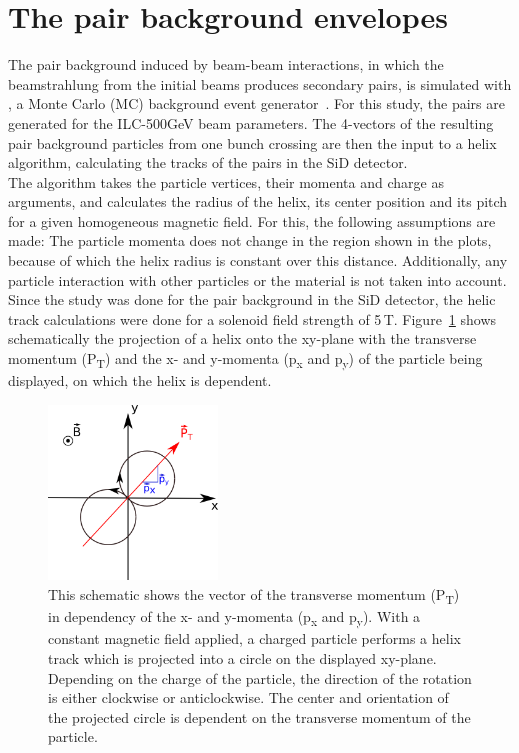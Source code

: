 \section{The pair background envelopes}
\label{Detector}
The pair background induced by beam-beam interactions, in which the beamstrahlung from the initial beams produces secondary \Pep \Pem pairs, is simulated with \guineapig, a Monte Carlo (MC) background event generator~\cite{Schulte:1997nga}.
For this study, the pairs are generated for the ILC-500GeV beam parameters.
The 4-vectors of the resulting pair background particles from one bunch crossing are then the input to a helix algorithm, calculating the tracks of the pairs in the SiD detector.\\
The algorithm takes the particle vertices, their momenta and charge as arguments, and calculates the radius of the helix, its center position and its pitch for a given homogeneous magnetic field.
For this, the following assumptions are made: 
The particle momenta does not change in the region shown in the plots, because of which the helix radius is constant over this distance.
Additionally, any particle interaction with other particles or the material is not taken into account.\\
Since the study was done for the pair background in the SiD detector, the helic track calculations were done for a solenoid field strength of \unit{5}\,{T}.
Figure~\ref{fig:helix_circle} shows schematically the projection of a helix onto the xy-plane with the transverse momentum (P\textsubscript{T}) and the x- and y-momenta (p\textsubscript{x} and p\textsubscript{y}) of the particle being displayed, on which the helix is dependent.

\begin{figure}
    \centering
    \includegraphics[width=0.4\textwidth]{figures/Helix_explanation.png}
    \caption[Projection of the helix on the xy-plane]{
    This schematic shows the vector of the transverse momentum (P\textsubscript{T}) in dependency of the x- and y-momenta (p\textsubscript{x} and p\textsubscript{y}).
    With a constant magnetic field applied, a charged particle performs a helix track which is projected into a circle on the displayed xy-plane.
    Depending on the charge of the particle, the direction of the rotation is either clockwise or anticlockwise.
    The center and orientation of the projected circle is dependent on the transverse momentum of the particle.
    }
    \label{fig:helix_circle}
\end{figure}

